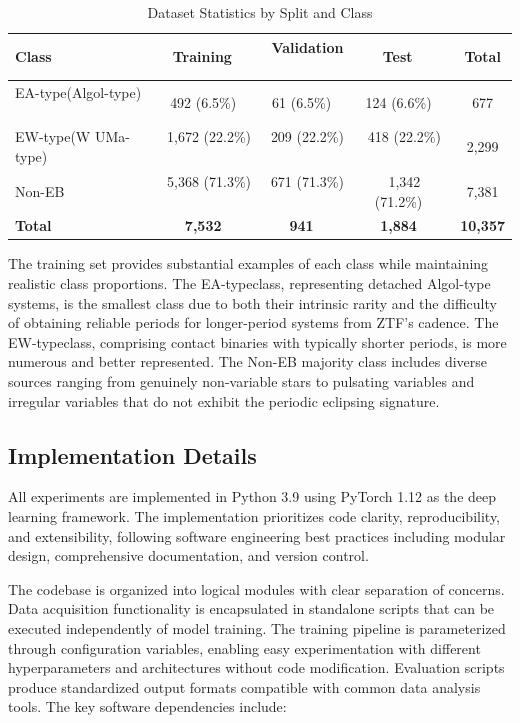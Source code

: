 \documentclass[11pt,a4paper]{article}
\newcommand{\EA}{EA-type}
\newcommand{\EW}{EW-type}
\begin{document}
\begin{table}[htbp]
\centering
\caption{Dataset Statistics by Split and Class}
\label{tab:dataset_stats}
\begin{tabular}{lccc|c}
\toprule
\textbf{Class} \ &  \textbf{Training} \ &  \textbf{Validation} \ &  \textbf{Test} \ &  \textbf{Total} \\
\midrule
\EA (Algol-type) \ &  492 (6.5\%) \ &  61 (6.5\%) \ &  124 (6.6\%) \ &  677 \\
\EW (W UMa-type) \ &  1,672 (22.2\%) \ &  209 (22.2\%) \ &  418 (22.2\%) \ &  2,299 \\
Non-EB \ &  5,368 (71.3\%) \ &  671 (71.3\%) \ &  1,342 (71.2\%) \ &  7,381 \\
\midrule
\textbf{Total} \ &  \textbf{7,532} \ &  \textbf{941} \ &  \textbf{1,884} \ &  \textbf{10,357} \\
\bottomrule
\end{tabular}
\end{table}

The training set provides substantial examples of each class while maintaining realistic class proportions. The \EA class, representing detached Algol-type systems, is the smallest class due to both their intrinsic rarity and the difficulty of obtaining reliable periods for longer-period systems from ZTF's cadence. The \EW class, comprising contact binaries with typically shorter periods, is more numerous and better represented. The Non-EB majority class includes diverse sources ranging from genuinely non-variable stars to pulsating variables and irregular variables that do not exhibit the periodic eclipsing signature.

\subsection{Implementation Details}

All experiments are implemented in Python 3.9 using PyTorch 1.12 as the deep learning framework. The implementation prioritizes code clarity, reproducibility, and extensibility, following software engineering best practices including modular design, comprehensive documentation, and version control.

The codebase is organized into logical modules with clear separation of concerns. Data acquisition functionality is encapsulated in standalone scripts that can be executed independently of model training. The training pipeline is parameterized through configuration variables, enabling easy experimentation with different hyperparameters and architectures without code modification. Evaluation scripts produce standardized output formats compatible with common data analysis tools. The key software dependencies include:
\end{document}
